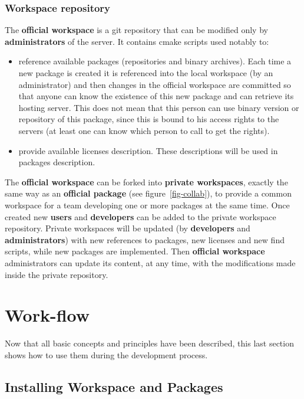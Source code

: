 \documentclass[12pt,a4paper]{article}
\begin{document}
\subsubsection{Workspace repository}

The \textbf{official workspace} is a git repository that can be modified only by \textbf{administrators} of the server. It contains cmake scripts used notably to:
\begin{itemize}
\item reference available packages (repositories and binary archives). Each time a new package is created it is referenced into the local workspace (by an administrator) and then changes in the official workspace are committed so that anyone can know the existence of this new package and can retrieve its hosting server. This does not mean that this person can use binary version or repository of this package, since this is bound to his access rights to the servers (at least one can know which person to call to get the rights).
\item provide available licenses description. These descriptions will be used in packages description.
\end{itemize}

The \textbf{official workspace} can be forked into \textbf{private workspaces}, exactly the same way as an \textbf{official package} (see figure~\ref{fig-collab}), to provide a common workspace for a team developing one or more packages at the same time. Once created new \textbf{users} and \textbf{developers} can be added to the private workspace repository. Private workspaces will be updated (by \textbf{developers} and \textbf{administrators}) with new references to packages, new licenses and new find scripts, while new packages are implemented. Then \textbf{official workspace} administrators can update its content, at any time, with the modifications made inside the private repository.

\pagebreak

\section{Work-flow}

Now that all basic concepts and principles have been described, this last section shows how to use them during the development process.

\subsection{Installing Workspace and Packages}
\end{document}
